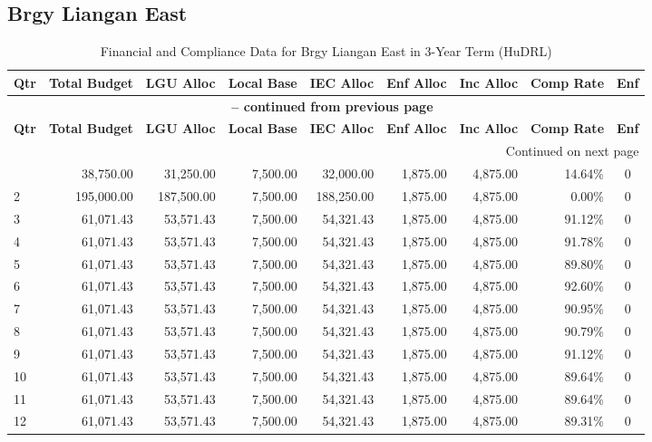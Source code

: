 \subsection{Brgy Liangan East}
\begin{longtable}{lrrrrrrrc}
\caption{Financial and Compliance Data for Brgy Liangan East in 3-Year Term (HuDRL)} \\
\toprule
\textbf{Qtr} & \textbf{Total Budget} & \textbf{LGU Alloc} & \textbf{Local Base} & \textbf{IEC Alloc} & \textbf{Enf Alloc} & \textbf{Inc Alloc} & \textbf{Comp Rate} & \textbf{Enf} \\
\midrule
\endfirsthead
\multicolumn{9}{c}{{\bfseries \tablename\ \thetable{} -- continued from previous page}} \\
\toprule
\textbf{Qtr} & \textbf{Total Budget} & \textbf{LGU Alloc} & \textbf{Local Base} & \textbf{IEC Alloc} & \textbf{Enf Alloc} & \textbf{Inc Alloc} & \textbf{Comp Rate} & \textbf{Enf} \\
\midrule
\endhead
\hline \multicolumn{9}{r}{{Continued on next page}} \\ \hline
\endfoot
\bottomrule
\endlastfoot
1 & 38,750.00 & 31,250.00 & 7,500.00 & 32,000.00 & 1,875.00 & 4,875.00 & 14.64\% & 0 \\
2 & 195,000.00 & 187,500.00 & 7,500.00 & 188,250.00 & 1,875.00 & 4,875.00 & 0.00\% & 0 \\
3 & 61,071.43 & 53,571.43 & 7,500.00 & 54,321.43 & 1,875.00 & 4,875.00 & 91.12\% & 0 \\
4 & 61,071.43 & 53,571.43 & 7,500.00 & 54,321.43 & 1,875.00 & 4,875.00 & 91.78\% & 0 \\
5 & 61,071.43 & 53,571.43 & 7,500.00 & 54,321.43 & 1,875.00 & 4,875.00 & 89.80\% & 0 \\
6 & 61,071.43 & 53,571.43 & 7,500.00 & 54,321.43 & 1,875.00 & 4,875.00 & 92.60\% & 0 \\
7 & 61,071.43 & 53,571.43 & 7,500.00 & 54,321.43 & 1,875.00 & 4,875.00 & 90.95\% & 0 \\
8 & 61,071.43 & 53,571.43 & 7,500.00 & 54,321.43 & 1,875.00 & 4,875.00 & 90.79\% & 0 \\
9 & 61,071.43 & 53,571.43 & 7,500.00 & 54,321.43 & 1,875.00 & 4,875.00 & 91.12\% & 0 \\
10 & 61,071.43 & 53,571.43 & 7,500.00 & 54,321.43 & 1,875.00 & 4,875.00 & 89.64\% & 0 \\
11 & 61,071.43 & 53,571.43 & 7,500.00 & 54,321.43 & 1,875.00 & 4,875.00 & 89.64\% & 0 \\
12 & 61,071.43 & 53,571.43 & 7,500.00 & 54,321.43 & 1,875.00 & 4,875.00 & 89.31\% & 0 \\
\end{longtable}
\newpage
